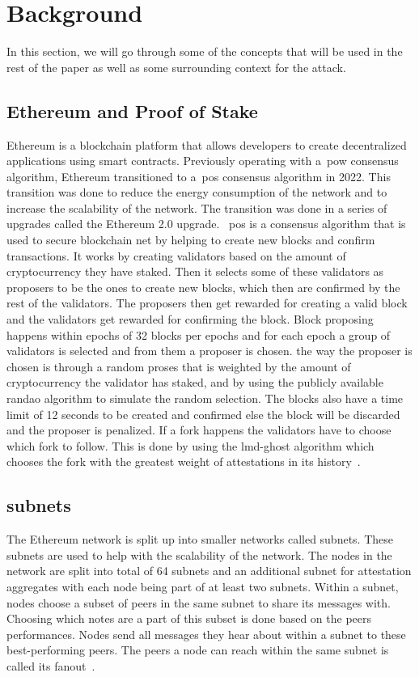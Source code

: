 
\section{Background}\label{sec:background}
In this section, we will go through some of the concepts that will be used in the rest of the paper as well as some surrounding context for the attack.

\subsection{Ethereum and Proof of Stake}\label{subsec:ethereum-and-proof-of-stake}
Ethereum is a blockchain platform that allows developers to create decentralized applications using smart contracts.
Previously operating with a~\gls{pow} consensus algorithm, Ethereum transitioned to a~\gls{pos} consensus algorithm in 2022.
This transition was done to reduce the energy consumption of the network and to increase the scalability of the network.
The transition was done in a series of upgrades called the Ethereum 2.0 upgrade.
~\gls{pos} is a consensus algorithm that is used to secure blockchain net by helping to create new blocks and confirm transactions.
It works by creating validators based on the amount of cryptocurrency they have staked.
Then it selects some of these validators as proposers to be the ones to create new blocks, which then are confirmed by the rest of the validators.
The proposers then get rewarded for creating a valid block and the validators get rewarded for confirming the block.
Block proposing happens within epochs of 32 blocks per epochs and for each epoch a group of validators is selected and from them a proposer is chosen.
the way the proposer is chosen is through a random proses that is weighted by the amount of cryptocurrency the validator has staked, and by using the publicly available \gls{randao} algorithm to simulate the random selection.
The blocks also have a time limit of 12 seconds to be created and confirmed else the block will be discarded and the proposer is penalized.
If a fork happens the validators have to choose which fork to follow.
This is done by using the \gls{lmd-ghost} algorithm which chooses the fork with the greatest weight of attestations in its history~\cite{EthereumProof-of-stakePoS}.

\subsection{subnets}\label{subsec:subnets}
The Ethereum network is split up into smaller networks called subnets.
These subnets are used to help with the scalability of the network.
The nodes in the network are split into total of 64 subnets and an additional subnet for attestation aggregates with each node being part of at least two subnets.
Within a subnet, nodes choose a subset of peers in the same subnet to share its messages with.
Choosing which notes are a part of this subset is done based on the peers performances.
Nodes send all messages they hear about within a subnet to these best-performing peers.
The peers a node can reach within the same subnet is called its fanout~\cite{heimbach2024deanonymizingethereumvalidatorsp2p}.



